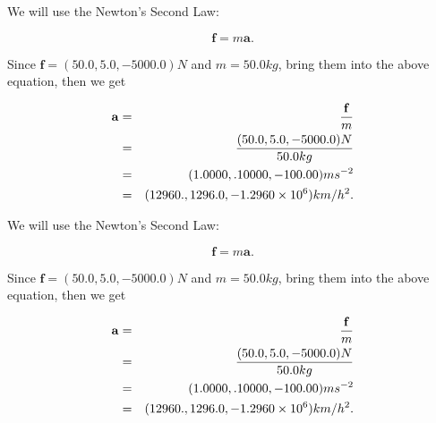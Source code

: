 \documentclass[12pt]{article}
\begin{document}
 
\noindent{}
 
 

We will use the Newton's Second Law:
 
\[
\mathbf{f}=m\mathbf{a}.
\]
 
Since $\mathbf{f}=( %
50.0,  %
5.0,  %
-5000.0 )N$
and $m= %
50.0 kg$, bring them into the above equation, then we get
 
\begin{eqnarray*}
\mathbf{a}&=&\frac{\mathbf{f}}m  \\
&=&\frac{(
50.0 ,
5.0 ,
-5000.0 )N
}{ %
50.0 kg}  \\
&=&(
1.0000 ,
.10000,
-100.00
)ms^{-2} \\
&=&(
12960. ,
1296.0 ,
-1.2960 \times 10^{6}
)km/h^2.
\end{eqnarray*}
 
 
 
\noindent{}
 
 

 
 
 
\noindent{}
 
 

We will use the Newton's Second Law:
 
\[
\mathbf{f}=m\mathbf{a}.
\]
 
Since $\mathbf{f}=( %
50.0,  %
5.0,  %
-5000.0 )N$
and $m= %
50.0 kg$, bring them into the above equation, then we get
 
\begin{eqnarray*}
\mathbf{a}&=&\frac{\mathbf{f}}m  \\
&=&\frac{(
50.0 ,
5.0 ,
-5000.0 )N
}{ %
50.0 kg}  \\
&=&(
1.0000 ,
.10000,
-100.00
)ms^{-2} \\
&=&(
12960. ,
1296.0 ,
-1.2960 \times 10^{6}
)km/h^2.
\end{eqnarray*}
 
 
 
\noindent{}
 
 

 
\vspace{0.3in}
   
   
   
\end{document}
